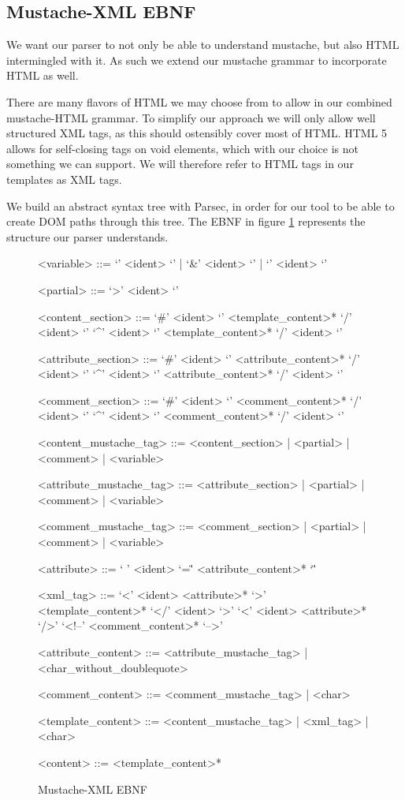 \documentclass[thesis.tex]{subfiles}
\begin{document}
\subsection{Mustache-XML EBNF}
We want our parser to not only be able to understand mustache, but also HTML
intermingled with it. As such we extend our mustache grammar to incorporate
HTML as well.

There are many flavors of HTML we may choose from to allow in our
combined mustache-HTML grammar. To simplify our approach we will only allow well
structured XML tags, as this should ostensibly cover most of HTML.
HTML 5 allows for self-closing tags on void elements, which with our choice is
not something we can support. We will therefore refer to HTML tags in our
templates as XML tags.

We build an abstract syntax tree with Parsec, in order for our tool to be
able to create DOM paths through this tree.
The EBNF in figure \ref{fig:mustache-xml.ebnf} represents the structure our
parser understands.

\begin{figure}
	\centering
	\setlength{\grammarindent}{4.2cm}
	\begin{grammar}
<variable> ::= `{{{' <ident> `}}}' | `{{&' <ident> `}}' | `{{' <ident> `}}'

<partial> ::= `{{>' <ident> `}}'

<content\_section> ::= `{{#' <ident> `}}' <template\_content>* `{{/' <ident> `}}'
                  \alt `{{^' <ident> `}}' <template\_content>* `{{/' <ident> `}}'

<attribute\_section> ::= `{{#' <ident> `}}' <attribute\_content>* `{{/' <ident> `}}'
                    \alt `{{^' <ident> `}}' <attribute\_content>* `{{/' <ident> `}}'

<comment\_section> ::= `{{\#' <ident> `}}' <comment\_content>* `{{/' <ident> `}}'
                  \alt `{{^' <ident> `}}' <comment\_content>* `{{/' <ident> `}}'

<content\_mustache\_tag> ::= <content\_section> | <partial> | <comment> | <variable>

<attribute\_mustache\_tag> ::= <attribute\_section> | <partial> | <comment> | <variable>

<comment\_mustache\_tag> ::= <comment\_section> | <partial> | <comment> | <variable>

<attribute> ::= ` ' <ident> `=\"' <attribute\_content>* `\"' 

<xml\_tag> ::= `<' <ident> <attribute>* `>' <template\_content>* `</' <ident> `>'
          \alt `<' <ident> <attribute>* `/>'
          \alt `<!--' <comment\_content>* `-->'

<attribute\_content> ::= <attribute\_mustache\_tag> | <char\_without\_doublequote>

<comment\_content> ::= <comment\_mustache\_tag> | <char>

<template\_content> ::= <content\_mustache\_tag> | <xml\_tag> | <char>

<content> ::= <template\_content>*
	\end{grammar}
	\caption{Mustache-XML EBNF}
	\label{fig:mustache-xml.ebnf}
\end{figure}
\end{document}
